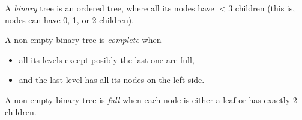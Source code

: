 A \emph{binary} tree is an ordered tree, where all its nodes have $<3$ children
(this is, nodes can have 0, 1, or 2 children).

A non-empty binary tree is \emph{complete} when
\begin{itemize}
\item all its levels except posibly the last one are full,
\item and the last level has all its nodes on the left side.
\end{itemize}

A non-empty binary tree is \emph{full} when each node is either a leaf or has
exactly 2 children.
